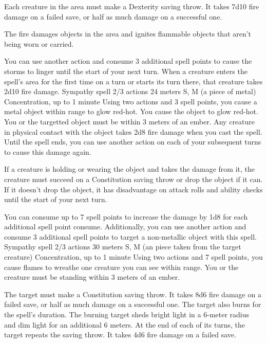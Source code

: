         Each creature in the area must make a Dexterity saving throw.
        It takes 7d10 fire damage on a failed save, or half as much damage on a successful one.

        The fire damages objects in the area and ignites flammable objects that aren't being worn or carried.

        You can use another action and consume 3 additional spell points to cause the storms to linger until the start of your next turn.
        When a creature enters the spell's area for the first time on a turn or starts its turn there, that creature takes 2d10 fire damage.
        {Sympathy spell}
        {2/3 actions}
        {24 meters}
        {S, M (a piece of metal)}
        {Concentration, up to 1 minute}
        Using two actions and 3 spell points, you cause a metal object within range to glow red-hot.
        You cause the object to glow red-hot.
        You or the targetted object must be within 3 meters of an ember.
        Any creature in physical contact with the object takes 2d8 fire damage when you cast the spell.
        Until the spell ends, you can use another action on each of your subsequent turns to cause this damage again.

        If a creature is holding or wearing the object and takes the damage from it, the creature must succeed on a Constitution saving throw or drop the object if it can.
        If it doesn't drop the object, it has disadvantage on attack rolls and ability checks until the start of your next turn.

        You can consume up to 7 spell points to increase the damage by 1d8 for each additional spell point consume.
        Additionally, you can use another action and consume 3 additional spell points to target a non-metallic object with this spell.
        {Sympathy spell}
        {2/3 actions}
        {30 meters}
        {S, M (an piece taken from the target creature)}
        {Concentration, up to 1 minute}
        Using two actions and 7 spell points, you cause flames to wreathe one creature you can see within range.
        You or the creature must be standing within 3 meters of an ember.

        The target must make a Constitution saving throw.
        It takes 8d6 fire damage on a failed save, or half as much damage on a successful one.
        The target also burns for the spell's duration.
        The burning target sheds bright light in a 6-meter radius and dim light for an additional 6 meters.
        At the end of each of its turns, the target repeats the saving throw.
        It takes 4d6 fire damage on a failed save.

